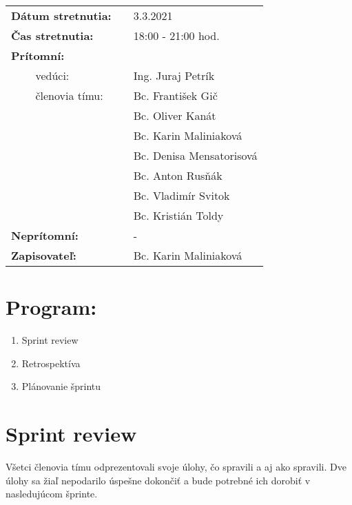 \documentclass{article}
\begin{document}
    

    \begin{table}[h]
        \begin{tabular}{lllll}
            \multicolumn{3}{l}{\textbf{Dátum stretnutia:}} & & 3.3.2021 \\
            \multicolumn{3}{l}{\textbf{Čas stretnutia:}} & & 18:00 - 21:00 hod. \\
            \multicolumn{3}{l}{\textbf{Prítomní:}} \\
            & & vedúci: & & Ing. Juraj Petrík \\
            & & členovia tímu: & & Bc. František Gič  \\
            & & & & Bc. Oliver Kanát \\
            & & & & Bc. Karin Maliniaková \\
            & & & & Bc. Denisa Mensatorisová \\
            & & & & Bc. Anton Rusňák \\
            & & & & Bc. Vladimír Svitok \\
            & & & & Bc. Kristián Toldy \\
            \multicolumn{3}{l}{\textbf{Neprítomní:}} & & -\\
            \multicolumn{3}{l}{\textbf{Zapisovateľ:}} & & Bc. Karin Maliniaková \\
        \end{tabular}
        \label{tab:grades}
    \end{table}

    \section*{Program:}

    \begin{enumerate}
        \item Sprint review
        \item Retrospektíva
        \item Plánovanie šprintu
    \end{enumerate}

    \section*{Sprint review}

        \textnormal {Všetci členovia tímu odprezentovali svoje úlohy, čo spravili a aj ako spravili. Dve úlohy sa žiaľ nepodarilo úspešne dokončiť a bude potrebné ich dorobiť v nasledujúcom šprinte.}
\end{document}

